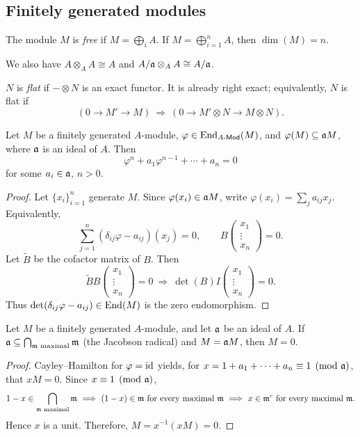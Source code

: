 \documentclass[11pt,a4paper]{article}
\begin{document}
\subsection{Finitely generated modules}
\setcounter{definition}{5}\begin{definition}
The module $M$ is \emph{free} if $M=\bigoplus_i A$. If $M=\bigoplus_{i=1}^n A$, then $\dim(M)=n$.
\end{definition}
We also have $A\otimes_A A\cong A$ and
$A/\aa\otimes_A A\cong A/\aa$.
\setcounter{definition}{6}\begin{definition}
$N$ is \emph{flat} if $-\otimes N$ is an exact functor. It is already right exact; equivalently, $N$ is flat if
\[
(0\to M'\to M)\ \Longrightarrow\ (0\to M'\otimes N\to M\otimes N).
\]
\end{definition}
\setcounter{theorem}{3}\begin{theorem}
Let $M$ be a finitely generated $A$-module, $\varphi\in\End_{\AMod}(M)$, and $\varphi(M)\subseteq\aa M$, where $\aa$ is an ideal of $A$. Then
\[
\varphi^n+a_1\varphi^{n-1}+\cdots+a_n=0
\]
for some $a_i\in\aa$, $n>0$.
\end{theorem}
\begin{proof}
Let $\{x_i\}_{i=1}^n$ generate $M$. Since $\varphi(x_i)\in\aa M$, write $\varphi(x_i)=\sum_j a_{ij}x_j$. Equivalently,
\[
\sum_{j=1}^n(\delta_{ij}\varphi-a_{ij})(x_j)=0,
\qquad B\begin{pmatrix}x_1\\\vdots\\x_n\end{pmatrix}=0.
\]
Let $\widetilde B$ be the cofactor matrix of $B$. Then
\[
\widetilde B B\begin{pmatrix}x_1\\\vdots\\x_n\end{pmatrix}=0
\ \Longrightarrow\
\det(B)I\begin{pmatrix}x_1\\\vdots\\x_n\end{pmatrix}=0.
\]
Thus $\det(\delta_{ij}\varphi-a_{ij})\in\End(M)$ is the zero endomorphism.
\end{proof}
\setcounter{theorem}{4}\begin{lemma}[Nakayama]
Let $M$ be a finitely generated $A$-module, and let $\aa$ be an ideal of $A$. If $\aa\subseteq\bigcap_{\mm\text{ maximal}}\mm$ (the Jacobson radical) and $M=\aa M$, then $M=0$.
\end{lemma}
\begin{proof}
Cayley--Hamilton for $\varphi=\id$ yields, for $x=1+a_1+\cdots+a_n\equiv1\pmod\aa$, that $xM=0$. Since $x\equiv1\pmod\aa$,
\[
1-x\in\bigcap_{\mm\text{ maximal}}\mm
\ \Longrightarrow\ (1-x)\in\mm\ \text{for every maximal }\mm
\ \Longrightarrow\ x\in\mm^c\ \text{for every maximal }\mm.
\]
Hence $x$ is a unit. Therefore, $M=x^{-1}(xM)=0$.
\end{proof}

\end{document}

